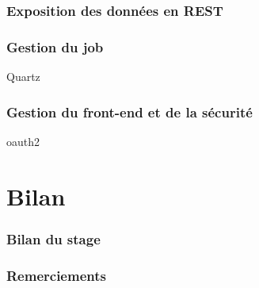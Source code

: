 \documentclass{beamer}
\begin{document}
\begin{frame}
\frametitle{Exposition des données en REST}

\end{frame}

\begin{frame}
\frametitle{Gestion du job}

Quartz

\end{frame}

\begin{frame}
\frametitle{Gestion du front-end et de la sécurité}

oauth2

\end{frame}

\section*{Bilan}

\begin{frame}
\frametitle{Bilan du stage}

\end{frame}

\begin{frame}
\frametitle{Remerciements}

\end{frame}
\end{document}
